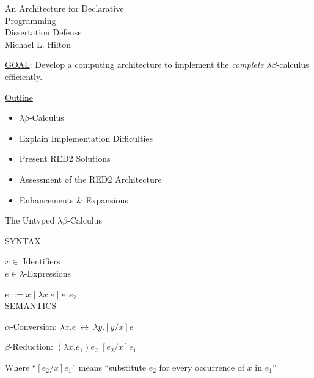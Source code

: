 \begin{slide}{}
\begin{center}
	An Architecture for Declarative\\
	Programming\\[1in]
	Dissertation Defense\\
	Michael L. Hilton\\[1in]
\end{center}
\begin{flushleft}
\underline{GOAL}: Develop a computing architecture to implement the 
{\em complete} $\lambda\beta$-calculus efficiently.
\end{flushleft}
\end{slide}

\begin{slide}{}
\begin{center}
	\underline{Outline}\\[.6in]
\end{center}
\begin{flushleft}
\begin{itemize}
\item $\lambda\beta$-Calculus
\item Explain Implementation Difficulties
\item Present RED2 Solutions
\item Assessment of the RED2 Architecture
\item Enhancements \& Expansions 
\end{itemize}
\end{flushleft}
\end{slide}



\begin{slide}{}
\begin{center}
	The Untyped $\lambda\beta$-Calculus\\[.75in]
\end{center}

\underline{SYNTAX}

$x \in $ Identifiers\\
$e \in \lambda$-Expressions

$e$ ::=  $x \mid \lambda x . e \mid e_1 e_2$\\[.5in]

\underline{SEMANTICS}

$\alpha$-Conversion:
$\lambda x . e\  \longleftrightarrow\ \lambda y .[y/x]e$

$\beta$-Reduction:
$(\lambda x . e_1) e_2$ \red $[e_2/x]e_1$

\begin{flushleft}
Where ``$[e_2/x]e_1$'' means ``substitute $e_2$ for every occurrence of
$x$ in $e_1$''
\end{flushleft}
\end{slide}

